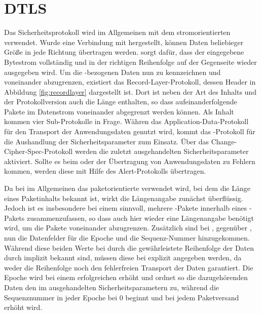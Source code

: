 \chapter{DTLS}
\label{chp:dtls}


Das Sicherheitsprotokoll  \cite{rfc5246} wird im Allgemeinen mit dem stromorientierten  verwendet.
Wurde eine Verbindung mit  hergestellt, können Daten beliebieger Größe in jede Richtung
übertragen werden.  sorgt dafür, dass der eingegebene Bytestrom vollständig und in der
richtigen Reihenfolge auf der Gegenseite wieder ausgegeben wird. Um die -bezogenen Daten nun
zu kennzeichnen und voneinander abzugrenzen, existiert das Record-Layer-Protokoll, dessen Header in Abbildung \ref{fig:recordlayer}
dargestellt ist. Dort ist neben der Art des Inhalts und der Protokollversion auch die Länge enthalten, so dass
aufeinanderfolgende Pakete im Datenstrom voneinander abgegrenzt werden können. Als Inhalt kommen vier Sub-Protokolle
in Frage. Währen das Application-Data-Protokoll für den Transport der Anwendungsdaten genutzt wird, kommt
das -Protokoll für die Aushandlung der Sicherheitsparameter zum Einsatz. Über das Change-Cipher-Spec-Protokoll
werden die zuletzt ausgehandelten Sicherheitsparameter aktiviert. Sollte es beim  oder der Übertragung
von Anwendungsdaten zu Fehlern kommen, werden diese mit Hilfe des Alert-Protokolls übertragen.

Da bei  \cite{rfc6347} im Allgemeinen das paketorientierte  verwendet wird, bei dem die Länge eines
Paketinhalts bekannt ist, wirkt die Längenangabe zunächst überflüssig. Jedoch ist es insbesondere bei einem
 sinnvoll, mehrere -Pakete innerhalb eines -Pakets zusammenzufassen,
so dass auch hier wieder eine Längenangabe benötigt wird, um die Pakete voneinander abzugrenzen.
Zusätzlich sind bei , gegenüber , nun die Datenfelder für die Epoche und die Sequenz-Nummer hinzugekommen.
Während diese beiden Werte bei  durch die gewährleistete Reihenfolge der Daten durch 
implizit bekannt sind, müssen diese bei  explizit angegeben werden, da  weder die
Reihenfolge noch den fehlerfreien Transport der Daten garantiert. Die Epoche wird bei einem erfolgreichen 
erhöht und ordnet so die dazugehörenden Daten den im  ausgehandelten Sicherheitsparametern zu,
während die Sequenznummer in jeder Epoche bei $ 0 $ beginnt und bei jedem Paketversand erhöht wird.

